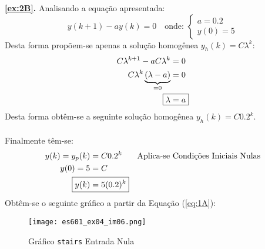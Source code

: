 \documentclass{article}
\begin{document}
            \begin{resolution}
                \textbf{\ref{ex:2B}.}  Analisando a equação apresentada:
                    \begin{equation*}
                        y(k+1) -ay(k) = 0
                        \quad
                        \text{onde: }
                        \begin{cases}
                            a    = 0.2\\
                            y(0) = 5
                        \end{cases}
                    \end{equation*}
                Desta forma propõem-se apenas a solução homogênea $y_{h}(k) = C\lambda^{k}$:
                    \begin{align}
                        C\lambda^{k + 1} - aC\lambda^{k} &= 0 \nonumber\\
                        C\lambda^{k} \underbrace{(\lambda - a)}_{=0} &= 0 \nonumber\\
                        \Aboxed{\lambda &= a}
                    \end{align}
                Desta forma obtêm-se a seguinte solução homogênea $y_{h}(k) = C0.2^{k}$.
                \\\\
                Finalmente têm-se:
                    \begin{align}
                        y(k) = y_{p}(k) &= C0.2^{k} & \text{Aplica-se Condições Iniciais Nulas}\nonumber\\
                        y(0) = 5 &= C \nonumber\\
                        \Aboxed{y(k) &= 5 (0.2)^{k}}
                    \end{align}
                Obtêm-se o seguinte gráfico a partir da Equação (\ref{eq:1A}):
                    \begin{figure}[H]
                        \centering
                        \texttt{[image: es601\_ex04\_im06.png]}
                        \caption{Gráfico \texttt{stairs} Entrada Nula}
                    \end{figure}
            \end{resolution}
\end{document}
